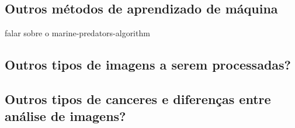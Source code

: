 





\subsection{Outros métodos de aprendizado de máquina}
falar sobre o marine-predators-algorithm
\subsection{Outros tipos de imagens a serem processadas?}
\subsection{Outros tipos de canceres e diferenças entre análise de imagens?}







 
 
